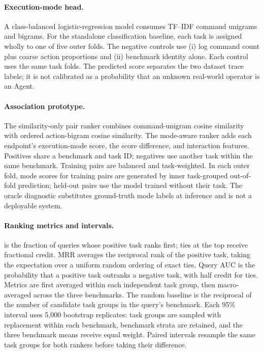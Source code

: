 \paragraph{Execution-mode head.} A class-balanced logistic-regression model consumes TF--IDF command unigrams and bigrams. For the standalone classification baseline, each task is assigned wholly to one of five outer folds. The negative controls use (i) log command count plus coarse action proportions and (ii) benchmark identity alone. Each control uses the same task folds. The predicted score separates the two dataset trace labels; it is not calibrated as a probability that an unknown real-world operator is an Agent.

\paragraph{Association prototype.} The similarity-only pair ranker combines command-unigram cosine similarity with ordered action-bigram cosine similarity. The mode-aware ranker adds each endpoint's execution-mode score, the score difference, and interaction features. Positives share a benchmark and task ID; negatives use another task within the same benchmark. Training pairs are balanced and task-weighted. In each outer fold, mode scores for training pairs are generated by inner task-grouped out-of-fold prediction; held-out pairs use the model trained without their task. The oracle diagnostic substitutes ground-truth mode labels at inference and is not a deployable system.

\paragraph{Ranking metrics and intervals.} \RecallAtOne is the fraction of queries whose positive task ranks first; ties at the top receive fractional credit. MRR averages the reciprocal rank of the positive task, taking the expectation over a uniform random ordering of exact ties. Query AUC is the probability that a positive task outranks a negative task, with half credit for ties. Metrics are first averaged within each independent task group, then macro-averaged across the three benchmarks. The random \RecallAtOne baseline is the reciprocal of the number of candidate task groups in the query's benchmark. Each 95\% interval uses 5,000 bootstrap replicates: task groups are sampled with replacement within each benchmark, benchmark strata are retained, and the three benchmark means receive equal weight. Paired intervals resample the same task groups for both rankers before taking their difference.

